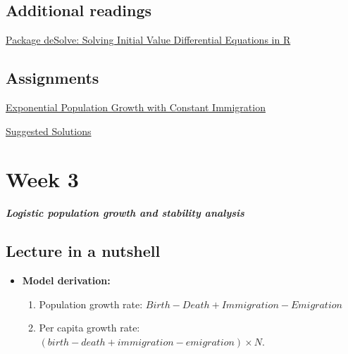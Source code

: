 \documentclass[
]{book}
\providecommand{\tightlist}{%
  \setlength{\itemsep}{0pt}\setlength{\parskip}{0pt}}
\begin{document}
\hypertarget{additional-readings-1}{%
\section*{Additional readings}\label{additional-readings-1}}

\href{./Additional\%20readings/Package\%20deSolve\%20-\%20Solving\%20Initial\%20Value\%20Differential\%20Equations\%20in\%20R.pdf}{Package deSolve: Solving Initial Value Differential Equations in R}

\hypertarget{assignments-1}{%
\section*{Assignments}\label{assignments-1}}

\href{./Assignments/Week2_Exponential\%20Growth.pdf}{Exponential Population Growth with Constant Immigration}

\href{./Assignments/Week2_Exponential\%20Growth_with_Solutions.pdf}{Suggested Solutions}

\hypertarget{week-3}{%
\chapter*{Week 3}\label{week-3}}

\textbf{\emph{Logistic population growth and stability analysis}}

\hypertarget{lecture-in-a-nutshell-2}{%
\section*{Lecture in a nutshell}\label{lecture-in-a-nutshell-2}}

\begin{itemize}
\tightlist
\item
  \textbf{Model derivation:}

  \begin{enumerate}
  \def\labelenumi{\arabic{enumi}.}
  \tightlist
  \item
    Population growth rate: \(Birth - Death + Immigration - Emigration\)
  \item
    Per capita growth rate: \((birth - death + immigration - emigration)\times N\).
  \end{enumerate}
\end{itemize}
\end{document}
